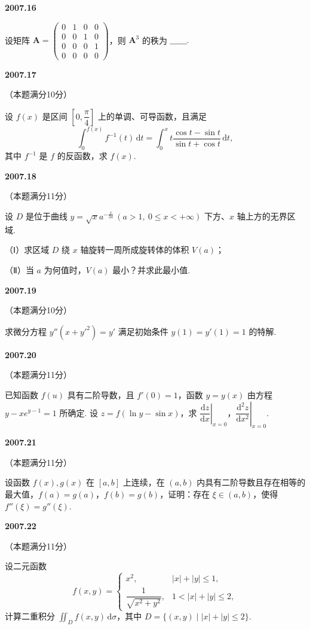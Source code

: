 \documentclass[UTF8,12pt,fontset=windows]{ctexart}
\begin{document}
\vfill
\newpage
{\large\bfseries 2007.16}

设矩阵 $\boldsymbol{A} = \begin{pmatrix} 0 & 1 & 0 & 0 \\ 0 & 0 & 1 & 0 \\ 0 & 0 & 0 & 1 \\ 0 & 0 & 0 & 0 \end{pmatrix}$，则 $\boldsymbol{A}^3$ 的秩为 $\_\_\_\_\_\_.$

\vfill
\newpage
{\large\bfseries 2007.17}

（本题满分10分）

设 $f(x)$ 是区间 $\left[0, \dfrac{\pi}{4}\right]$ 上的单调、可导函数，且满足
$$\int_0^{f(x)} f^{-1}(t)\,\mathrm{d}t = \int_0^x t\frac{\cos t - \sin t}{\sin t + \cos t}\,\mathrm{d}t,$$
其中 $f^{-1}$ 是 $f$ 的反函数，求 $f(x)$.

\vfill
\newpage
{\large\bfseries 2007.18}

（本题满分11分）

设 $D$ 是位于曲线 $y = \sqrt{x}a^{-\frac{x}{2a}}\,(a > 1,\ 0 \leqslant x < +\infty)$ 下方、$x$ 轴上方的无界区域.

（Ⅰ）求区域 $D$ 绕 $x$ 轴旋转一周所成旋转体的体积 $V(a)$；

（Ⅱ）当 $a$ 为何值时，$V(a)$ 最小？并求此最小值.

\vfill
\newpage
{\large\bfseries 2007.19}

（本题满分10分）

求微分方程 $y''(x+y'^2) = y'$ 满足初始条件 $y(1) = y'(1) = 1$ 的特解.

\vfill
\newpage
{\large\bfseries 2007.20}

（本题满分11分）

已知函数 $f(u)$ 具有二阶导数，且 $f'(0) = 1$，函数 $y = y(x)$ 由方程 $y - xe^{y-1} = 1$ 所确定. 设 $z = f(\ln y - \sin x)$，求 $\left.\dfrac{\mathrm{d}z}{\mathrm{d}x}\right|_{x=0}$，$\left.\dfrac{\mathrm{d}^2z}{\mathrm{d}x^2}\right|_{x=0}$.

\vfill
\newpage
{\large\bfseries 2007.21}

（本题满分11分）

设函数 $f(x),g(x)$ 在 $[a,b]$ 上连续，在 $(a,b)$ 内具有二阶导数且存在相等的最大值，$f(a) = g(a)$，$f(b) = g(b)$，证明：存在 $\xi \in (a,b)$，使得 $f''(\xi) = g''(\xi)$.

\vfill
\newpage
{\large\bfseries 2007.22}

（本题满分11分）

设二元函数
$$f(x,y) = \begin{cases} x^2, & |x|+|y| \leqslant 1, \\ \dfrac{1}{\sqrt{x^2+y^2}}, & 1 < |x|+|y| \leqslant 2, \end{cases}$$
计算二重积分 $\displaystyle\iint_D f(x,y)\,\mathrm{d}\sigma$，其中 $D = \{(x,y) \mid |x|+|y| \leqslant 2\}$.
\end{document}
